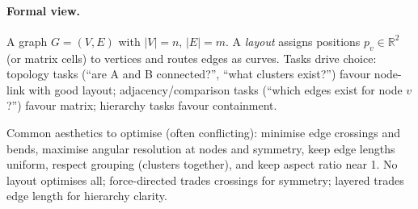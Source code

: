 \paragraph{Formal view.} A graph $G=(V,E)$ with $|V|=n$, $|E|=m$. A \emph{layout} assigns positions $p_v\in\mathbb{R}^2$ (or matrix cells) to vertices and routes edges as curves. Tasks drive choice: topology tasks (``are A and B connected?'', ``what clusters exist?'') favour node-link with good layout; adjacency/comparison tasks (``which edges exist for node $v$?'') favour matrix; hierarchy tasks favour containment.

\begin{definition}[Aesthetics]\label{def:aesthetics}
Common aesthetics to optimise (often conflicting): minimise edge crossings and bends, maximise angular resolution at nodes and symmetry, keep edge lengths uniform, respect grouping (clusters together), and keep aspect ratio near 1. No layout optimises all; force-directed trades crossings for symmetry; layered trades edge length for hierarchy clarity.
\end{definition}

